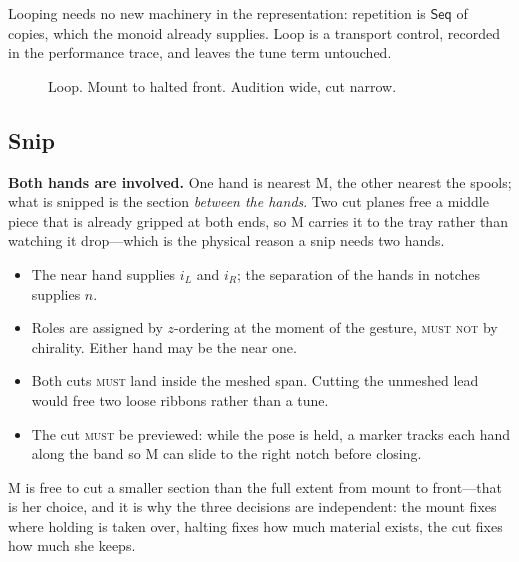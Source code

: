 \documentclass[11pt,a4paper]{article}
\newcommand{\MUST}{\textsc{must}}
\newcommand{\MUSTNOT}{\textsc{must not}}
\theoremstyle{definition}
\theoremstyle{plain}
\theoremstyle{remark}
\newcommand{\spools}{%
  \fill[ribL,opacity=.45,rounded corners=2pt] (1.55,5.40) rectangle (2.45,5.95);
  \fill[ribR,opacity=.45,rounded corners=2pt] (5.55,5.40) rectangle (6.45,5.95);
  \node[font=\scriptsize] at (2,6.22) {left spool};
  \node[font=\scriptsize] at (6,6.22) {right spool};
}
\newcommand{\musician}{%
  \draw[gray] (4,-0.10) circle (0.23);
  \node[font=\scriptsize] at (4,-0.10) {M};
}
\newcommand{\axes}{%
  \draw[->,gray,thin] (0.85,4.30) -- (1.45,4.30) node[right,font=\scriptsize]{$x$};
  \draw[->,gray,thin] (0.85,4.30) -- (0.85,4.90) node[above,font=\scriptsize]{$z$};
}
\newcommand{\ribbonszipped}{%
  \draw[ribL,opacity=.45,line width=16pt,line join=round]
    (2,5.40) -- (2,4.60) -- (3.72,4.20) -- (3.72,2.20) -- (3.10,1.70) -- (3.10,0.70);
  \draw[ribR,opacity=.45,line width=16pt,line join=round]
    (6,5.40) -- (6,4.60) -- (4.28,4.20) -- (4.28,2.20) -- (4.90,1.70) -- (4.90,0.70);
}
\newcommand{\mesh}[2]{%
  \draw[gray!75,decorate,decoration={zigzag,segment length=5pt,amplitude=3pt}]
    (4,#1) -- (4,#2);
}
\newcommand{\mountclips}{%
  \fill[amb,opacity=.75,rounded corners=1pt] (3.76,1.05) rectangle (3.92,1.45);
  \fill[amb,opacity=.75,rounded corners=1pt] (4.08,1.05) rectangle (4.24,1.45);
}
\newcommand{\handat}[2]{\filldraw[fill=white,draw=gray!80,thin] (#1,#2) circle (0.17);}
\newcommand{\handsdefault}{\handat{3.10}{0.55}\handat{4.90}{0.55}}
\begin{document}
Looping needs no new machinery in the representation: repetition is $\mathsf{Seq}$ of copies, which
the monoid already supplies. Loop is a transport control, recorded in the performance trace, and
leaves the tune term untouched.

\begin{figure}[H]\centering
{}
\caption{Loop. Mount to halted front. Audition wide, cut narrow.}
\end{figure}

\subsection{Snip}

\textbf{Both hands are involved.} One hand is nearest M, the other nearest the spools; what is
snipped is the section \emph{between the hands}. Two cut planes free a middle piece that is already
gripped at both ends, so M carries it to the tray rather than watching it drop---which is the
physical reason a snip needs two hands.

\begin{itemize}[leftmargin=*]
\item The near hand supplies $i_L$ and $i_R$; the separation of the hands in notches supplies $n$.
\item Roles are assigned by $z$-ordering at the moment of the gesture, \MUSTNOT{} by chirality.
      Either hand may be the near one.
\item Both cuts \MUST{} land inside the meshed span. Cutting the unmeshed lead would free two loose
      ribbons rather than a tune.
\item The cut \MUST{} be previewed: while the pose is held, a marker tracks each hand along the
      band so M can slide to the right notch before closing.
\end{itemize}

M is free to cut a smaller section than the full extent from mount to front---that is her choice,
and it is why the three decisions are independent: the mount fixes where holding is taken over,
halting fixes how much material exists, the cut fixes how much she keeps.
\end{document}
